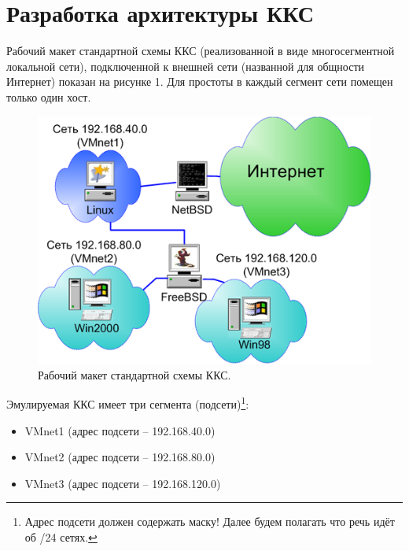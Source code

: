 \documentclass[a4paper, 12pt]{article}		%
\begin{document}

\tableofcontents





\newpage
\section{Разработка архитектуры ККС}

Рабочий макет стандартной схемы ККС (реализованной в виде многосегментной локальной сети), подключенной к внешней сети (названной для общности Интернет) показан на рисунке 1. Для простоты в каждый сегмент сети помещен только один хост.

\begin{figure}[h!]
\centering
\includegraphics[scale=1]{res/network_general}
\caption{Рабочий макет стандартной схемы ККС.}
\end{figure}

Эмулируемая ККС имеет три сегмента (подсети)\footnote{Адрес подсети должен содержать маску! Далее будем полагать что речь идёт об /24 сетях.}:
\begin{itemize}
\item VMnet1 (адрес подсети – 192.168.40.0)
\item VMnet2 (адрес подсети – 192.168.80.0)
\item VMnet3 (адрес подсети – 192.168.120.0)
\end{itemize}
\end{document}
